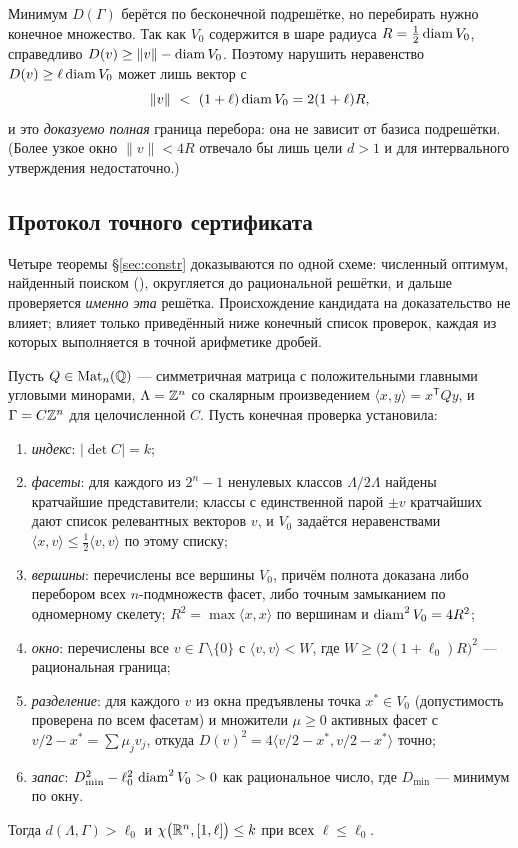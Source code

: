 Минимум $D(\Gamma)$ берётся по бесконечной подрешётке, но перебирать нужно
конечное множество. Так как $V_0$ содержится в шаре радиуса $R=\frac12\operatorname{diam} V_0$,
справедливо $D(v)\ge\|v\|-\operatorname{diam} V_0$. Поэтому нарушить неравенство
$D(v)\ge\ell\operatorname{diam} V_0$ может лишь вектор с
\begin{equation}\label{eq:window}
\|v\|\ <\ (1+\ell)\operatorname{diam} V_0=2(1+\ell)R ,
\end{equation}
и это \emph{доказуемо полная} граница перебора: она не зависит от базиса
подрешётки. (Более узкое окно $\|v\|<4R$ отвечало бы лишь цели $d>1$ и для
интервального утверждения недостаточно.)

\subsection{Протокол точного сертификата}\label{ssec:protocol}

Четыре теоремы \S\ref{sec:constr} доказываются по одной схеме: численный
оптимум, найденный поиском (\cite{Repo}), округляется до рациональной
решётки, и дальше проверяется \emph{именно эта} решётка. Происхождение
кандидата на доказательство не влияет; влияет только приведённый ниже
конечный список проверок, каждая из которых выполняется в точной арифметике
дробей.

\begin{proposition}\label{prop:protocol}
Пусть $Q\in\mathrm{Mat}_n(\mathbb{Q})$ --- симметричная матрица с положительными
главными угловыми минорами, $\Lambda=\mathbb{Z}^n$ со скалярным произведением
$\langle x,y\rangle=x^{\mathsf T}Qy$, и $\Gamma=C\mathbb{Z}^n$ для целочисленной
$C$. Пусть конечная проверка установила:
\begin{enumerate}[leftmargin=2.2em,itemsep=1pt,label=\textup{(\roman*)}]
\item \emph{индекс}: $|\det C|=k$;
\item \emph{фасеты}: для каждого из $2^n-1$ ненулевых классов $\Lambda/2\Lambda$
найдены кратчайшие представители; классы с единственной парой $\pm v$
кратчайших дают список релевантных векторов $v$, и $V_0$ задаётся
неравенствами $\langle x,v\rangle\le\frac12\langle v,v\rangle$ по этому списку;
\item \emph{вершины}: перечислены все вершины $V_0$, причём полнота
доказана либо перебором всех $n$-подмножеств фасет, либо точным замыканием
по одномерному скелету; $R^2=\max\langle x,x\rangle$ по вершинам и
$\operatorname{diam}^2V_0=4R^2$;
\item \emph{окно}: перечислены все $v\in\Gamma\setminus\{0\}$ с
$\langle v,v\rangle<W$, где $W\ge\bigl(2(1+\ell_0)R\bigr)^2$ --- рациональная
граница;
\item \emph{разделение}: для каждого $v$ из окна предъявлены точка
$x^*\in V_0$ (допустимость проверена по всем фасетам) и множители
$\mu\ge0$ активных фасет с $v/2-x^*=\sum\mu_jv_j$, откуда
$D(v)^2=4\langle v/2-x^*,v/2-x^*\rangle$ точно;
\item \emph{запас}: $D_{\min}^2-\ell_0^2\,\operatorname{diam}^2V_0>0$ как рациональное число,
где $D_{\min}$ --- минимум по окну.
\end{enumerate}
Тогда $d(\Lambda,\Gamma)>\ell_0$ и $\chi\bigl(\mathbb{R}^n,[1,\ell]\bigr)\le k$ при
всех $\ell\le\ell_0$.
\end{proposition}

